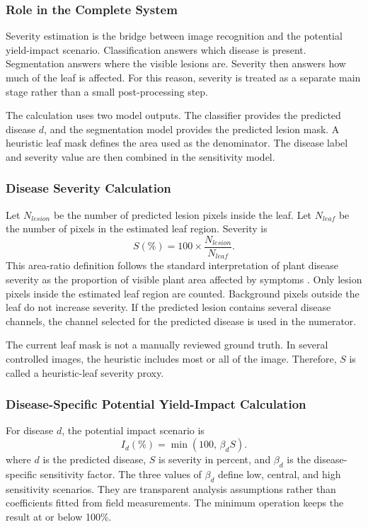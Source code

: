 \documentclass[12pt,a4paper]{article}
\begin{document}
\subsubsection{Role in the Complete System}
Severity estimation is the bridge between image recognition and the potential yield-impact
scenario. Classification answers which disease is present. Segmentation answers where the
visible lesions are. Severity then answers how much of the leaf is affected. For this
reason, severity is treated as a separate main stage rather than a small post-processing
step.

The calculation uses two model outputs. The classifier provides the predicted disease
$d$, and the segmentation model provides the predicted lesion mask. A heuristic leaf mask
defines the area used as the denominator. The disease label and severity value are then
combined in the sensitivity model.

\subsubsection{Disease Severity Calculation}
Let $N_{lesion}$ be the number of predicted lesion pixels inside the leaf. Let $N_{leaf}$
be the number of pixels in the estimated leaf region. Severity is
\begin{equation}
S(\%)=100\times\frac{N_{lesion}}{N_{leaf}}.
\label{eq:severity}
\end{equation}
This area-ratio definition follows the standard interpretation of plant disease severity
as the proportion of visible plant area affected by symptoms \cite{bock2010severity}.
Only lesion pixels inside the estimated leaf region are counted. Background pixels outside
the leaf do not increase severity. If the predicted lesion contains several disease
channels, the channel selected for the predicted disease is used in the numerator.

The current leaf mask is not a manually reviewed ground truth. In several controlled
images, the heuristic includes most or all of the image. Therefore, $S$ is called a
heuristic-leaf severity proxy.

\subsubsection{Disease-Specific Potential Yield-Impact Calculation}
For disease $d$, the potential impact scenario is
\begin{equation}
I_d(\%)=\min\left(100,\,\beta_d S\right).
\label{eq:impact}
\end{equation}
where $d$ is the predicted disease, $S$ is severity in percent, and $\beta_d$ is the
disease-specific sensitivity factor. The three values of $\beta_d$ define low, central,
and high sensitivity scenarios. They are transparent analysis assumptions rather than
coefficients fitted from field measurements.
The minimum operation keeps the result at or below 100\%.
\end{document}
